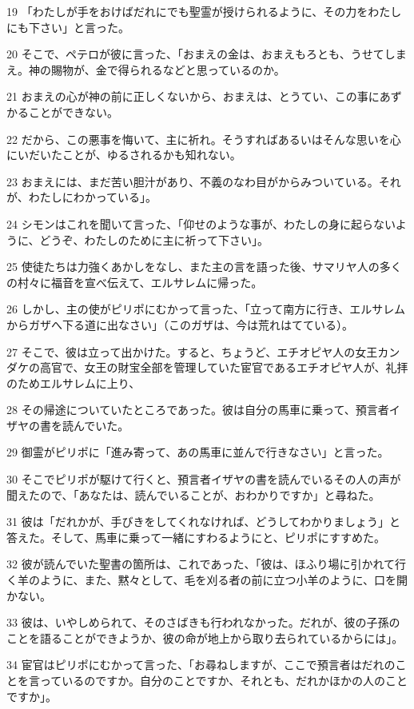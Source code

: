 \par 19 「わたしが手をおけばだれにでも聖霊が授けられるように、その力をわたしにも下さい」と言った。
\par 20 そこで、ペテロが彼に言った、「おまえの金は、おまえもろとも、うせてしまえ。神の賜物が、金で得られるなどと思っているのか。
\par 21 おまえの心が神の前に正しくないから、おまえは、とうてい、この事にあずかることができない。
\par 22 だから、この悪事を悔いて、主に祈れ。そうすればあるいはそんな思いを心にいだいたことが、ゆるされるかも知れない。
\par 23 おまえには、まだ苦い胆汁があり、不義のなわ目がからみついている。それが、わたしにわかっている」。
\par 24 シモンはこれを聞いて言った、「仰せのような事が、わたしの身に起らないように、どうぞ、わたしのために主に祈って下さい」。
\par 25 使徒たちは力強くあかしをなし、また主の言を語った後、サマリヤ人の多くの村々に福音を宣べ伝えて、エルサレムに帰った。
\par 26 しかし、主の使がピリポにむかって言った、「立って南方に行き、エルサレムからガザへ下る道に出なさい」（このガザは、今は荒れはてている）。
\par 27 そこで、彼は立って出かけた。すると、ちょうど、エチオピヤ人の女王カンダケの高官で、女王の財宝全部を管理していた宦官であるエチオピヤ人が、礼拝のためエルサレムに上り、
\par 28 その帰途についていたところであった。彼は自分の馬車に乗って、預言者イザヤの書を読んでいた。
\par 29 御霊がピリポに「進み寄って、あの馬車に並んで行きなさい」と言った。
\par 30 そこでピリポが駆けて行くと、預言者イザヤの書を読んでいるその人の声が聞えたので、「あなたは、読んでいることが、おわかりですか」と尋ねた。
\par 31 彼は「だれかが、手びきをしてくれなければ、どうしてわかりましょう」と答えた。そして、馬車に乗って一緒にすわるようにと、ピリポにすすめた。
\par 32 彼が読んでいた聖書の箇所は、これであった、「彼は、ほふり場に引かれて行く羊のように、また、黙々として、毛を刈る者の前に立つ小羊のように、口を開かない。
\par 33 彼は、いやしめられて、そのさばきも行われなかった。だれが、彼の子孫のことを語ることができようか、彼の命が地上から取り去られているからには」。
\par 34 宦官はピリポにむかって言った、「お尋ねしますが、ここで預言者はだれのことを言っているのですか。自分のことですか、それとも、だれかほかの人のことですか」。
